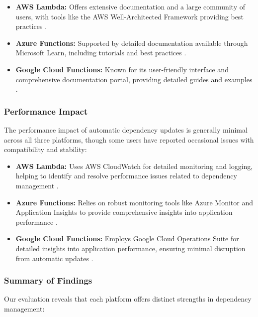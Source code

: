 \documentclass[sigconf]{acmart}
\begin{document}
\begin{itemize}
    \item \textbf{AWS Lambda:} Offers extensive documentation and a large community of users, with tools like the AWS Well-Architected Framework providing best practices \cite{awsWell2023}.
    \item \textbf{Azure Functions:} Supported by detailed documentation available through Microsoft Learn, including tutorials and best practices \cite{azureLearn2023}.
    \item \textbf{Google Cloud Functions:} Known for its user-friendly interface and comprehensive documentation portal, providing detailed guides and examples \cite{googleDocs2023}.
\end{itemize}

\subsubsection{Performance Impact}

The performance impact of automatic dependency updates is generally minimal across all three platforms, though some users have reported occasional issues with compatibility and stability:

\begin{itemize}
    \item \textbf{AWS Lambda:} Uses AWS CloudWatch for detailed monitoring and logging, helping to identify and resolve performance issues related to dependency management \cite{lambdaPerformance2023}.
    \item \textbf{Azure Functions:} Relies on robust monitoring tools like Azure Monitor and Application Insights to provide comprehensive insights into application performance \cite{azurePerformance2023}.
    \item \textbf{Google Cloud Functions:} Employs Google Cloud Operations Suite for detailed insights into application performance, ensuring minimal disruption from automatic updates \cite{googlePerformance2023}.
\end{itemize}

\subsubsection{Summary of Findings}

Our evaluation reveals that each platform offers distinct strengths in dependency management:
\end{document}
